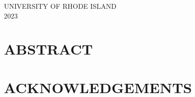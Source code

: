 
\vfill
\begin{center}
  UNIVERSITY OF RHODE ISLAND\\
  {2023}   %
\end{center}



\chapter*{\centering ABSTRACT}
\thispagestyle{empty}
\pagestyle{empty}   %
\newpage
\pagestyle{plain}



\chapter*{\centering ACKNOWLEDGEMENTS}
\newpage

